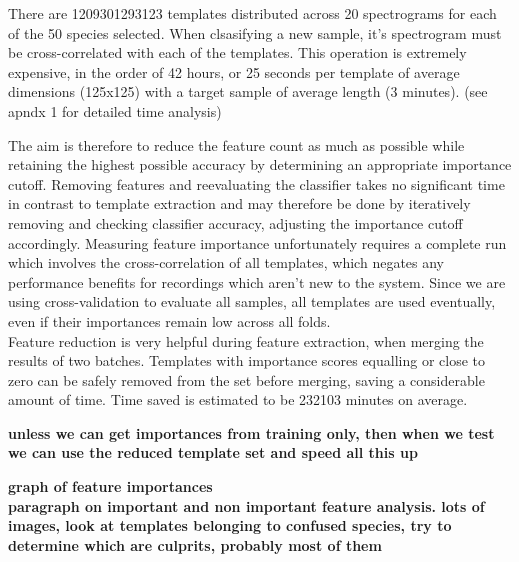 There are 1209301293123 templates distributed across 20 spectrograms for each
of the 50 species selected.
When clsasifying a new sample, it's spectrogram must be cross-correlated with
each of the templates.
This operation is extremely expensive, in the order of 42 hours, or 25 seconds
per template of average dimensions (125x125) with a target sample of average
length (3 minutes). (see apndx 1 for detailed time analysis)

The aim is therefore to reduce the feature count as much as possible while
retaining the highest possible accuracy by determining an appropriate importance
cutoff.
Removing features and reevaluating the classifier takes no significant time in
contrast to template extraction and may therefore be done by iteratively removing
and checking classifier accuracy, adjusting the importance cutoff accordingly.
Measuring feature importance unfortunately requires a complete run which involves
the cross-correlation of all templates, which negates any performance benefits
for recordings which aren't new to the system.
Since we are using cross-validation to evaluate all samples, all templates are
used eventually, even if their importances remain low across all folds.\\

Feature reduction is very helpful during feature extraction, when merging the
results of two batches.
Templates with importance scores equalling or close to zero can be safely removed
from the set before merging, saving a considerable amount of time.
Time saved is estimated to be 232103 minutes on average.

\textbf{unless we can get importances from training only, then when we test
we can use the reduced template set and speed all this up}

\textbf{graph of feature importances}\\


\textbf{paragraph on important and non important feature analysis. lots of 
images, look at templates belonging to confused species, try to determine
which are culprits, probably most of them}
